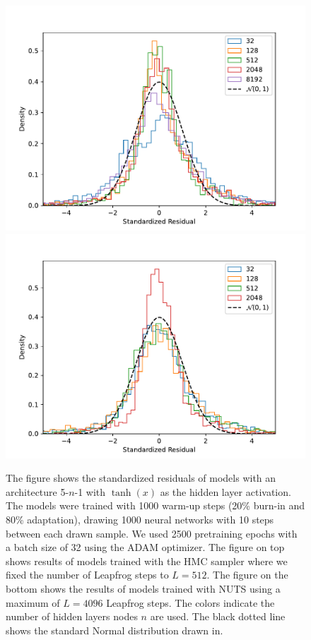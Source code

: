 \begin{figure}[H]
    \centering
    \includegraphics[scale=0.7]{figures/standardized_residuals/effect_of_num_params/standardized_residual_HMC.pdf}
    \includegraphics[scale=0.7]{figures/standardized_residuals/effect_of_num_params/standardized_residual_NUTS.pdf}
    \caption{
        The figure shows the standardized residuals of models with an architecture 5-$n$-1 with $\tanh(x)$ as the hidden layer activation. The models were trained with 1000 warm-up steps (20\% burn-in and 80\% adaptation), drawing 1000 neural networks with 10 steps between each drawn sample. We used 2500 pretraining epochs with a batch size of 32 using the ADAM optimizer. The figure on top shows results of models trained with the HMC sampler where we fixed the number of Leapfrog steps to $L = 512$. The figure on the bottom shows the results of models trained with NUTS using a maximum of $L = 4096$ Leapfrog steps. The colors indicate the number of hidden layers nodes $n$ are used. The black dotted line shows the standard Normal distribution drawn in.
    }
    \label{fig:standardized_residual_vs_params}
\end{figure}

